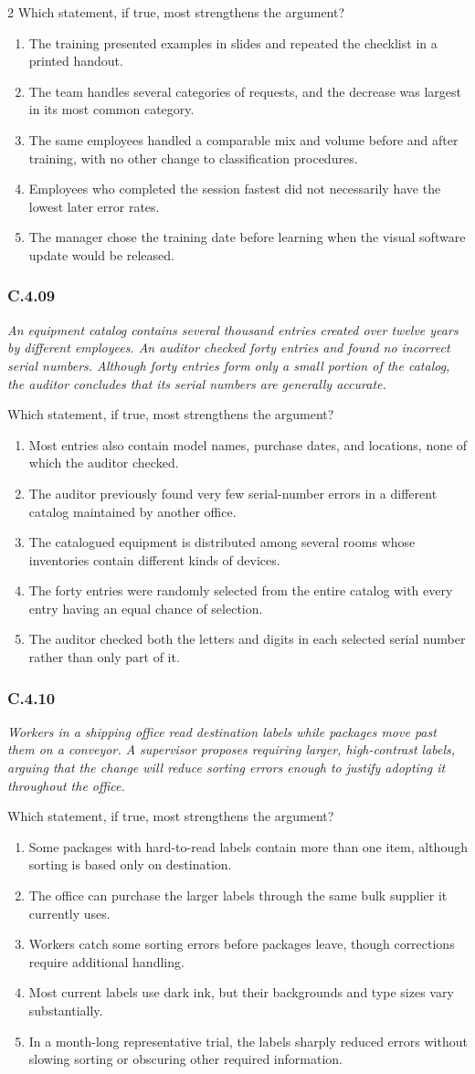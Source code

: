 \documentclass[10pt]{extarticle}
\newcommand{\choice}[1]{\item #1}
\newcommand{\bankitem}[1]{\subsubsection*{#1}}
\begin{document}
\begin{multicols}{2}
Which statement, if true, most strengthens the argument?
\begin{enumerate}[label=(\alph*)]
  \choice{The training presented examples in slides and repeated the checklist in a printed handout.}
  \choice{The team handles several categories of requests, and the decrease was largest in its most common category.}
  \choice{The same employees handled a comparable mix and volume before and after training, with no other change to classification procedures.}
  \choice{Employees who completed the session fastest did not necessarily have the lowest later error rates.}
  \choice{The manager chose the training date before learning when the visual software update would be released.}
\end{enumerate}
\bankitem{C.4.09}
\emph{An equipment catalog contains several thousand entries created over twelve years by different employees. An auditor checked forty entries and found no incorrect serial numbers. Although forty entries form only a small portion of the catalog, the auditor concludes that its serial numbers are generally accurate.}

Which statement, if true, most strengthens the argument?
\begin{enumerate}[label=(\alph*)]
  \choice{Most entries also contain model names, purchase dates, and locations, none of which the auditor checked.}
  \choice{The auditor previously found very few serial-number errors in a different catalog maintained by another office.}
  \choice{The catalogued equipment is distributed among several rooms whose inventories contain different kinds of devices.}
  \choice{The forty entries were randomly selected from the entire catalog with every entry having an equal chance of selection.}
  \choice{The auditor checked both the letters and digits in each selected serial number rather than only part of it.}
\end{enumerate}
\bankitem{C.4.10}
\emph{Workers in a shipping office read destination labels while packages move past them on a conveyor. A supervisor proposes requiring larger, high-contrast labels, arguing that the change will reduce sorting errors enough to justify adopting it throughout the office.}

Which statement, if true, most strengthens the argument?
\begin{enumerate}[label=(\alph*)]
  \choice{Some packages with hard-to-read labels contain more than one item, although sorting is based only on destination.}
  \choice{The office can purchase the larger labels through the same bulk supplier it currently uses.}
  \choice{Workers catch some sorting errors before packages leave, though corrections require additional handling.}
  \choice{Most current labels use dark ink, but their backgrounds and type sizes vary substantially.}
  \choice{In a month-long representative trial, the labels sharply reduced errors without slowing sorting or obscuring other required information.}
\end{enumerate}

\end{multicols}
\end{document}
